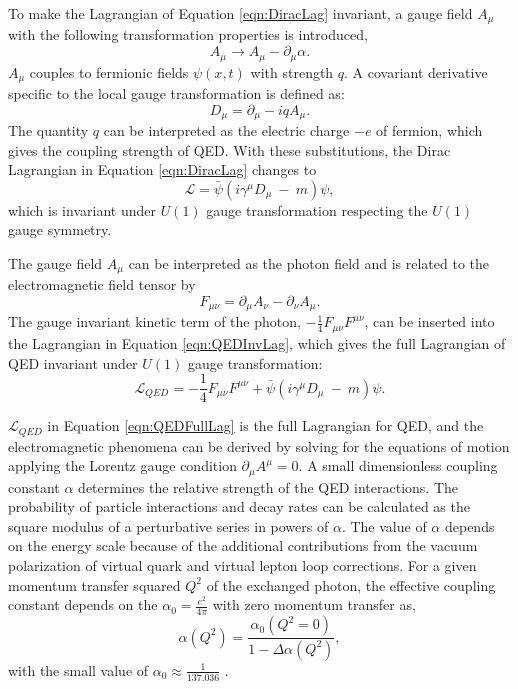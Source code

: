To make the Lagrangian of Equation \ref{eqn:DiracLag} invariant, a gauge field $A_{\mu}$ with the following transformation properties is introduced, 
\begin{equation}
A_{\mu}\rightarrow A_{\mu} - \partial _{\mu} \alpha. 
\label{eqn:QEDGaugeField}
\end{equation}  
$A_{\mu}$ couples to fermionic fields $\psi(x,t)$ with strength $q$. A covariant derivative specific to the local gauge transformation is defined as:
\begin{equation}
D_{\mu} = \partial_{\mu} - iqA_{\mu}.
\label{eqn:QEDCovDerv}
\end{equation}  
The quantity $q$ can be interpreted as the electric charge $-e$ of fermion, which gives the coupling strength of QED. With these substitutions, the Dirac Lagrangian in Equation \ref{eqn:DiracLag} changes to
\begin{equation}
\mathcal{L} = \bar{\psi} ( i \gamma^{\mu} D_{\mu} ~-~ m) \psi,
\label{eqn:QEDInvLag}
\end{equation}
which is invariant under $U(1)$ gauge transformation respecting the $U(1)$ gauge symmetry. 

The gauge field $A_{\mu}$ can be interpreted as the photon field and is related to the electromagnetic field tensor by
\begin{equation}
F_{\mu\nu} = \partial_{\mu}A_{\nu} - \partial_{\nu}A_{\mu}.
\label{QEDFieldTensor}
\end{equation}
The gauge invariant kinetic term of the photon, $-\frac{1}{4}F_{\mu\nu}F^{\mu\nu}$, can be inserted into the Lagrangian in Equation \ref{eqn:QEDInvLag}, which gives the full Lagrangian of QED invariant under $U(1)$ gauge transformation: 
\begin{equation}
\mathcal{L}_{QED} = -\frac{1}{4}F_{\mu\nu}F^{\mu\nu} + \bar{\psi} ( i \gamma^{\mu} D_{\mu} ~-~ m) \psi.
\label{eqn:QEDFullLag}
\end{equation}

$\mathcal{L}_{QED}$ in Equation \ref{eqn:QEDFullLag} is the full Lagrangian for QED, and the electromagnetic phenomena can be derived by solving for the equations of motion applying the Lorentz gauge condition $\partial_{\mu}A^{\mu}=0$. A small dimensionless coupling constant $\alpha$ determines the relative strength of the QED interactions. The probability of particle interactions and decay rates can be calculated as the square modulus of a perturbative series in powers of $\alpha$. The value of $\alpha$ depends on the energy scale because of the additional contributions from the vacuum polarization of virtual quark and virtual lepton loop corrections. For a given momentum transfer squared $Q^2$ of the exchanged photon, the effective coupling constant depends on the $\alpha_{0} = \frac{e^2}{4\pi}$ with zero momentum transfer as, 
\begin{equation}
    \alpha(Q^2) = \frac{\alpha_{0} (Q^2=0)}{1-\Delta \alpha(Q^2)},
\end{equation}
with the small value of $\alpha_{0} \approx \frac{1}{137.036}$ \cite{AlphaQED}.

